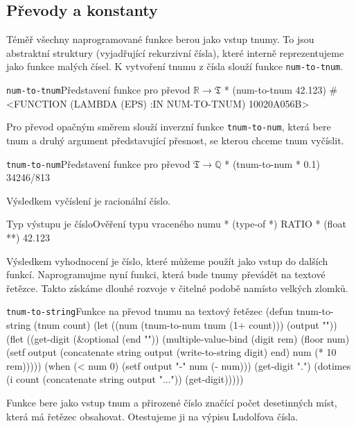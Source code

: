 \subsection{Převody a konstanty}
Téměř všechny naprogramované funkce berou jako vstup tnumy. To jsou abstraktní struktury (vyjadřující rekurzivní čísla), které interně reprezentujeme jako funkce malých čísel. K vytvoření tnumu z čísla slouží funkce \texttt{num-to-tnum}.

\begin{lisptest}{\texttt{num-to-tnum}}{Představení funkce pro převod $\mathbb{R}\to\mathfrak{T}$}
* (num-to-tnum 42.123)
#<FUNCTION (LAMBDA (EPS) :IN NUM-TO-TNUM) {10020A056B}>
\end{lisptest}

Pro převod opačným směrem slouží inverzní funkce \texttt{tnum-to-num}, která bere tnum a druhý argument představující přesnost, se kterou chceme tnum vyčíslit.

\begin{lisptest}{\texttt{tnum-to-num}}{Představení funkce pro převod $\mathfrak{T}\to\mathbb{Q}$}
* (tnum-to-num * 0.1)
34246/813
\end{lisptest}

Výsledkem vyčíslení je racionální číslo.

\begin{lisptest}{Typ výstupu je číslo}{Ověření typu vraceného numu}
* (type-of *)
RATIO
* (float **)
42.123
\end{lisptest}

Výsledkem vyhodnocení je číslo, které můžeme použít jako vstup do dalších funkcí. Naprogramujme nyní funkci, která bude tnumy převádět na textové řetězce. Takto získáme dlouhé rozvoje v čitelné podobě namísto velkých zlomků.

\begin{lispcode}{\texttt{tnum-to-string}}{Funkce na převod tnumu na textový řetězec}
(\textcolor{funkcionalni}{defun} \textcolor{pojmenovan}{tnum-to-string} (tnum count)
  (\textcolor{vedlejsi}{let} ((num (\textcolor{moje}{tnum-to-num} tnum (\textcolor{matematicke}{1+} count))) (output ""))
    (\textcolor{vedlejsi}{flet} ((get-digit (&optional (end ""))
             (\textcolor{matematicke}{multiple-value-bind} (digit rem) (\textcolor{matematicke}{floor} num)
               (\textcolor{vedlejsi}{setf} output (\textcolor{matematicke}{concatenate} \textquotesingle\textcolor{moje}{string} output 
                                         (\textcolor{funkcionalni}{write-to-string} digit)
                                         end)
                     num (\textcolor{matematicke}{*} 10 rem)))))
      (\textcolor{funkcionalni}{when} (\textcolor{matematicke}{<} num 0) (\textcolor{vedlejsi}{setf} output "-" num (\textcolor{matematicke}{-} num)))
      (\textcolor{moje}{get-digit} ".")  
      (\textcolor{funkcionalni}{dotimes} (i count (\textcolor{matematicke}{concatenate} \textquotesingle\textcolor{moje}{string} output "..."))
        (\textcolor{moje}{get-digit})))))
\end{lispcode}
Funkce bere jako vstup tnum a přirozené číslo značící počet desetinných míst, která má řetězec obsahovat. Otestujeme ji na výpisu Ludolfova čísla.

